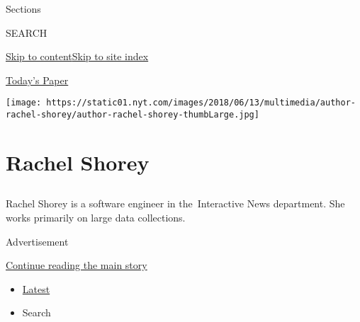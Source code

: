Sections

SEARCH

\protect\hyperlink{site-content}{Skip to
content}\protect\hyperlink{site-index}{Skip to site index}

\href{https://myaccount.nytimes.com/auth/login?response_type=cookie\&client_id=vi}{}

\href{https://www.nytimes.com/section/todayspaper}{Today's Paper}

\texttt{[image: https://static01.nyt.com/images/2018/06/13/multimedia/author-rachel-shorey/author-rachel-shorey-thumbLarge.jpg]}

\hypertarget{rachel-shorey}{%
\section{Rachel Shorey}\label{rachel-shorey}}

\subsection{}

Rachel Shorey is a software engineer in the~Interactive News department.
She works primarily on large data collections.

Advertisement

\protect\hyperlink{after-mid1}{Continue reading the main story}

\begin{itemize}
\tightlist
\item
  \protect\hyperlink{stream-panel}{Latest}
\item
  Search
\end{itemize}

